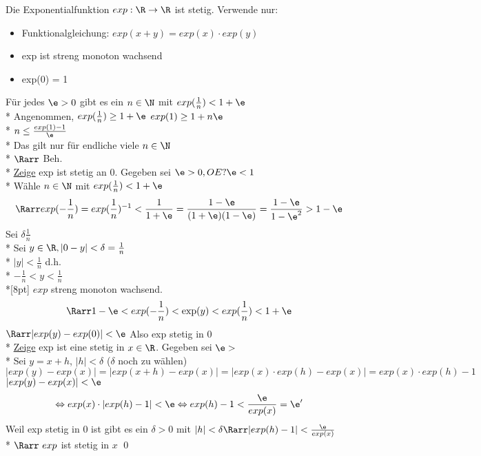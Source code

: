 Die Exponentialfunktion $exp: \R \to \R$ ist stetig.
\bew
Verwende nur:
\begin{itemize}
\item{Funktionalgleichung: $exp(x + y) = exp(x) \cdot exp(y)$}
\item{exp ist streng monoton wachsend}
\item{exp(0) = 1}
\end{itemize}
Für jedes $\e > 0$ gibt es ein $n \in \N$ mit $exp(\frac{1}{n}) < 1 + \e$\\*
Angenommen, $exp(\frac{1}{n}) \geq 1 + \e$
$exp(1) \geq 1 + n \e$\\*
$n \leq \frac{exp(1) - 1}{\e}$\\*
Das gilt nur für endliche viele $n \in \N$\\*
$\Rarr$ Beh.\\*
\ul{Zeige} exp ist stetig an 0. Gegeben sei $\e > 0, OE ? \e < 1$\\*
Wähle $n \in \N$ mit $exp(\frac{1}{n}) < 1 + \e$
$$\Rarr exp(-\frac{1}{n}) = exp(\frac{1}{n})^{-1} < \frac{1}{1 + \e} = \frac{1 - \e}{(1+\e)(1-\e)} = \frac{1-\e}{1 - \e^2} > 1 - \e$$
Sei $\delta \frac{1}{n}$\\*
Sei $y \in \R, |0 - y| < \delta = \frac{1}{n}$\\*
$|y| < \frac{1}{n}$ d.h.\\*
$-\frac{1}{n} < y < \frac{1}{n}$\\*[8pt]
$exp$ streng monoton wachsend.
$$\Rarr 1 - \e < exp(-\frac{1}{n}) < \exp(y) < exp(\frac{1}{n}) < 1 + \e$$
$\Rarr |exp(y) - exp(0)| < \e$ Also exp stetig in 0\\*
\ul{Zeige} exp ist eine stetig in $x \in \R$. Gegeben sei $\e > $\\*
Sei $y = x + h$, $|h| < \delta$ ($\delta$ noch zu wählen)
$$|exp(y) - exp(x)| = |exp(x + h) - exp(x)| = |exp(x) \cdot exp(h) - exp(x)| = exp(x) \cdot exp(h) -1$$
$|exp(y) -exp(x) | < \e$
$$\Leftrightarrow exp(x) \cdot |exp(h) - 1| < \e \Leftrightarrow exp(h) - 1 < \frac{\e}{exp(x)} = \e '$$
Weil exp stetig in 0 ist gibt es ein $\delta > 0$ mit $|h| < \delta \Rarr |exp(h) -1| < \frac{\e}{exp(x)}$\\*
$\Rarr\ exp$ ist stetig in $x$ \qed

